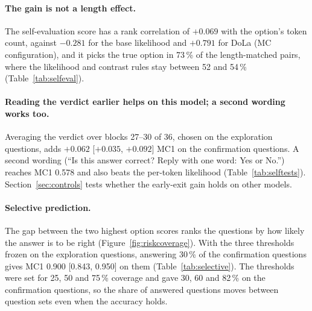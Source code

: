 \documentclass[11pt]{article}
\newcommand{\mainmodel}{Qwen2.5-3B-Instruct}
\begin{document}
\begin{table}[t]
\centering\small\setlength{\tabcolsep}{3.5pt}
\caption{Self-evaluation and the likelihood and contrast rules on the exploration and confirmation questions
(\mainmodel{}). For the self-evaluation rows, MC2 uses the log-odds of Equation~\eqref{eq:selfeval} in place of the
log-likelihood; the token-count baseline has no MC2. Matched pairs: length-matched pairwise accuracy as in
Table~\ref{tab:length}. Length correlation: mean within-question rank correlation with the option's token count.}
\label{tab:selfeval}
\end{table}

\begin{table}[t]
\centering\small\setlength{\tabcolsep}{3.5pt}
\caption{Paired comparisons on the 400 confirmation questions, as frozen before they were scored: three main
comparisons and two ablations. $p$: exact McNemar on MC1, Holm-adjusted over all 20 $p$-values of the design. MC2
and MC3: mean differences, all with 95\,\% intervals that exclude 0.}
\label{tab:selftests}
\end{table}

\paragraph{The gain is not a length effect.}
The self-evaluation score has a rank correlation of $+0.069$ with the option's token count, against $-0.281$ for
the base likelihood and $+0.791$ for DoLa (MC configuration), and it picks the true option in 73\,\% of the
length-matched pairs, where the likelihood and contrast rules stay between 52 and 54\,\% (Table~\ref{tab:selfeval}).

\paragraph{Reading the verdict earlier helps on this model; a second wording works too.}
Averaging the verdict over blocks 27--30 of 36, chosen on the exploration questions, adds $+0.062$ [$+0.035$,
$+0.092$] MC1 on the confirmation questions. A second wording (``Is this answer correct? Reply with one word: Yes
or No.'') reaches MC1 0.578 and also beats the per-token likelihood (Table~\ref{tab:selftests}). Section~\ref{sec:controls}
tests whether the early-exit gain holds on other models.

\paragraph{Selective prediction.}
The gap between the two highest option scores ranks the questions by how likely the answer is to be right
(Figure~\ref{fig:riskcoverage}). With the three thresholds frozen on the exploration questions, answering 30\,\% of
the confirmation questions gives MC1 0.900 [0.843, 0.950] on them (Table~\ref{tab:selective}). The thresholds were
set for 25, 50 and 75\,\% coverage and gave 30, 60 and 82\,\% on the confirmation questions, so the share of
answered questions moves between question sets even when the accuracy holds.
\end{document}
